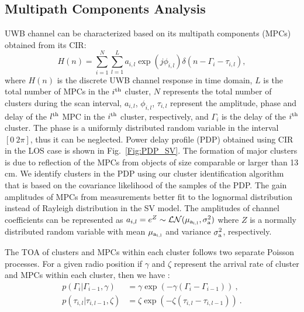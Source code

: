 \documentclass[conference]{IEEEtran}
\begin{document}
\subsection{Multipath Components Analysis}
UWB channel can be characterized based on its multipath components (MPCs) obtained from its CIR:  
\begin{equation}
H(n) = \sum_{i=1}^{N} \sum_{ l=1}^{L}a_{i,l}\exp(j\phi_{i,l})\delta(n-\Gamma_{ i}-\tau_{i,l}) , \label{Eq:CIR_SV}
\end{equation}
where $H(n)$ is the discrete UWB channel response in time domain, $L$ is the total number of MPCs in the $i^{\rm th}$ cluster, $N$ represents the total number of clusters during the scan interval, $a_{ i,l}$, $\phi_{i,l}$, $\tau_{i,l}$ represent the amplitude, phase and delay of the $l^{\rm th}$ MPC in the $i^{\rm th}$ cluster, respectively, and $\Gamma_{i}$ is the delay of the $i^{\rm th}$ cluster. The phase is a uniformly distributed random variable in the interval $[0 \ 2\pi]$, thus it can be neglected. Power delay profile (PDP) obtained using CIR in the LOS case is shown in Fig.~\ref{Fig:PDP_SV}. The formation of major clusters is due to reflection of the MPCs from objects of size comparable or larger than 13 cm. We identify clusters in the PDP using our cluster identification algorithm that is based on the covariance likelihood of the samples of the PDP. The gain amplitudes of MPCs from measurements better fit to the lognormal distribution instead of Rayleigh distribution in the SV model. The amplitudes of channel coefficients can be represented as $ a_{i,l} = e^{Z}  \sim\mathcal{LN}(\mu_{\rm a_{i,l}},\sigma_{\rm a}^2) $ where $Z$ is a normally distributed random variable with mean $\mu_{\rm a_{i,l}}$ and variance $\sigma_{\rm a}^2$, respectively.  


The TOA of clusters and MPCs within each cluster follows two separate Poisson processes. For a given radio position if $\gamma$ and $\zeta$ represent the arrival rate of cluster and MPCs within each cluster, then we have \cite{molisch00,Saleh}:
\begin{align}
p(\Gamma_i|\Gamma_{i-1},\gamma) &= \gamma \exp(-\gamma(\Gamma_{i}-\Gamma_{i-1}))~,\\
p(\tau_{i,l}|\tau_{i,l-1},\zeta) &= \zeta \exp(-\zeta(\tau_{i,l}-\tau_{i,l-1}))~.
\end{align}
\end{document}

